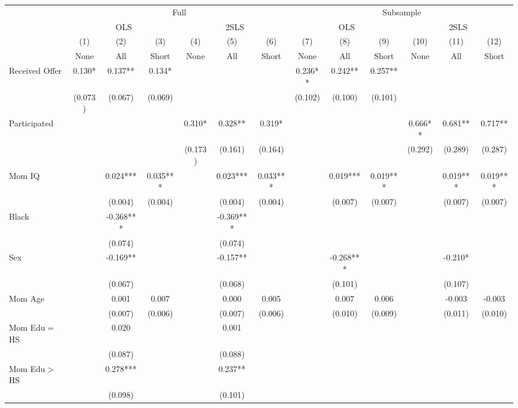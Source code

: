 \begin{tabular}{lcccccccccccc}
\toprule 
\midrule 
 & \multicolumn{6}{c}{Full} & \multicolumn{6}{c}{Subsample} \\
 \cmidrule(lr){2-7} \cmidrule(lr){8-13} 
 & \multicolumn{3}{c}{OLS} & \multicolumn{3}{c}{2SLS} & \multicolumn{3}{c}{OLS} & \multicolumn{3}{c}{2SLS} \\
 \cmidrule(lr){2-4} \cmidrule(lr){5-7} \cmidrule(lr){8-10} \cmidrule(lr){11-13} 
 & (1) & (2) & (3) & (4) & (5) & (6) & (7) & (8) & (9) & (10) & (11) & (12) \\
 & None & All & Short & None & All & Short & None & All & Short & None & All & Short \\
\midrule 
Received Offer & 0.130* & 0.137** & 0.134* &  &  &  & 0.236** & 0.242** & 0.257** &  &  &  \\
 & (0.073) & (0.067) & (0.069) &  &  &  & (0.102) & (0.100) & (0.101) &  &  &  \\
Participated &  &  &  & 0.310* & 0.328** & 0.319* &  &  &  & 0.666** & 0.681** & 0.717** \\
 &  &  &  & (0.173) & (0.161) & (0.164) &  &  &  & (0.292) & (0.289) & (0.287) \\
Mom IQ &  & 0.024*** & 0.035*** &  & 0.023*** & 0.033*** &  & 0.019*** & 0.019*** &  & 0.019*** & 0.019*** \\
 &  & (0.004) & (0.004) &  & (0.004) & (0.004) &  & (0.007) & (0.007) &  & (0.007) & (0.007) \\
Black &  & -0.368*** &  &  & -0.369*** &  &  &  &  &  &  &  \\
 &  & (0.074) &  &  & (0.074) &  &  &  &  &  &  &  \\
Sex &  & -0.169** &  &  & -0.157** &  &  & -0.268*** &  &  & -0.210* &  \\
 &  & (0.067) &  &  & (0.068) &  &  & (0.101) &  &  & (0.107) &  \\
Mom Age &  & 0.001 & 0.007 &  & 0.000 & 0.005 &  & 0.007 & 0.006 &  & -0.003 & -0.003 \\
 &  & (0.007) & (0.006) &  & (0.007) & (0.006) &  & (0.010) & (0.009) &  & (0.011) & (0.010) \\
Mom Edu$=$HS &  & 0.020 &  &  & 0.001 &  &  &  &  &  &  &  \\
 &  & (0.087) &  &  & (0.088) &  &  &  &  &  &  &  \\
Mom Edu$>$HS &  & 0.278*** &  &  & 0.237** &  &  &  &  &  &  &  \\
 &  & (0.098) &  &  & (0.101) &  &  &  &  &  &  &  \\

\end{tabular}

